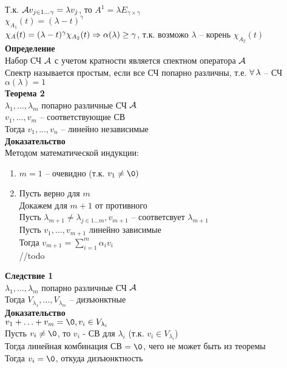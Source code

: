 \documentclass[12pt]{article}
\begin{document}
Т.к. $\mathcal{A} v_{j\in 1\ldots\gamma} = \lambda v_j$, то $A^1 = \lambda E_{\gamma\times \gamma}$\\
$\chi_{A_1}(t) = (\lambda - t)^\gamma$\\
$\chi_A(t) = (\lambda - t)^\gamma\chi_{A_2}(t) \Rightarrow \alpha(\lambda) \geq \gamma$, т.к. возможо $\lambda$ -- корень $\chi_{A_2}(t)$\\
\textbf{Определение}\\
Набор СЧ $\mathcal{A}$ с учетом кратности является спектном оператора $\mathcal{A}$\\
Спектр называется простым, если все СЧ попарно различны, т.е. $\forall\, \lambda$ -- СЧ $\alpha(\lambda) = 1$\\
\textbf{Теорема 2}\\
$\lambda_1, \ldots, \lambda_m$ попарно различные СЧ $\mathcal{A}$\\
$v_1, \ldots, v_m$ -- соответствующие СВ\\
Тогда $v_1, \ldots, v_n$ -- линейно независимые\\
\textbf{Доказательство}\\
Методом математической индукции:
\begin{enumerate}
    \item $m = 1$ -- очевидно (т.к. $v_1 \neq \0)$
    \item Пусть верно для $m$\\
    Докажем для $m+1$ от противного\\
    Пусть $\lambda_{m+1} \neq \lambda_{j \in 1\ldots m}, v_{m+1}$ -- соответсвует $\lambda_{m+1}$\\
    Пусть $v_1,\ldots,v_{m+1}$ линейно зависимые\\
    Тогда $v_{m+1} = \sum_{i=1}^m \alpha_i v_i$\\
    //todo
\end{enumerate}
\textbf{Следствие 1}\\
$\lambda_1, \ldots, \lambda_m$ попарно различные СЧ $\mathcal{A}$\\
Тогда $V_{\lambda_1}, \ldots, V_{\lambda_m}$ -- дизъюнктные\\
\textbf{Доказательство}\\
$v_1 + \ldots + v_m = \0, v_i \in V_{\lambda_i}$\\
Пусть $v_i \neq \0$, то $v_i$ - СВ для $\lambda_i$ (т.к. $v_i \in V_{\lambda_i}$)\\
Тогда линейная комбинация СВ $=\0$, чего не может быть из теоремы\\
Тогда $v_i = \0$, откуда дизъюнктность\\
\end{document}
